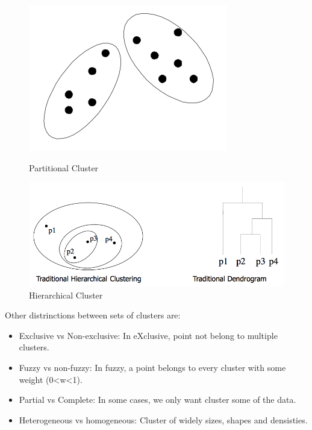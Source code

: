 \documentclass[12pt]{article}
\begin{document}
\begin{figure}[h!]
  \centering
  \begin{minipage}{.45\textwidth}
    \centering
    \includegraphics[width=\linewidth]{images/part.png}
    \caption{Partitional Cluster}
    \label{fig:part}
  \end{minipage}\hfill
  \begin{minipage}{.45\textwidth}
    \centering
    \includegraphics[width=\linewidth]{images/hier.png}
    \caption{Hierarchical Cluster}
    \label{fig:hier}
  \end{minipage}\hfill
\end{figure}

Other distrinctions between sets of clusters are:
\begin{itemize}
  \item Exclusive vs Non-exclusive: In eXclusive, point not belong to multiple clusters.
  \item Fuzzy vs non-fuzzy: In fuzzy, a point belongs to every cluster with some weight (0<w<1).
  \item Partial vs Complete: In some cases, we only want cluster some of the data.
  \item Heterogeneous vs homogeneous: Cluster of widely sizes, shapes and densisties.
\end{itemize}
\end{document}
